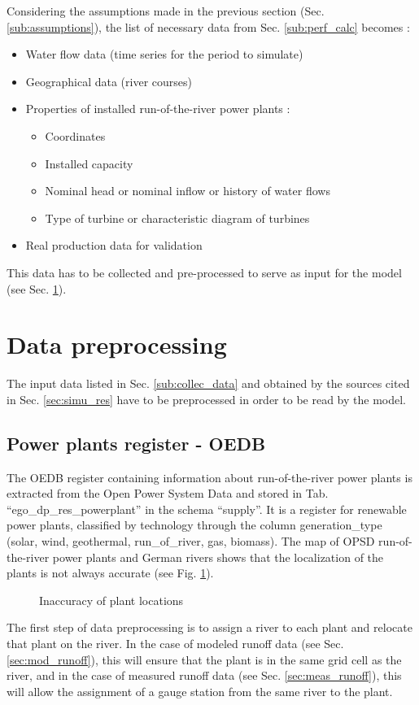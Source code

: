 Considering the assumptions made in the previous section (Sec. \ref{sub:assumptions}), the list of necessary data from Sec. \ref{sub:perf_calc} becomes :
\begin{itemize}
 \item Water flow data (time series for the period to simulate)
 \item Geographical data (river courses)
 \item Properties of installed run-of-the-river power plants :
 \begin{itemize}
  \item Coordinates
  \item Installed capacity
  \item Nominal head or nominal inflow or history of water flows
  \item Type of turbine or characteristic diagram of turbines
 \end{itemize}
 \item Real production data for validation
\end{itemize}

This data has to be collected and pre-processed to serve as input for the model (see Sec. \ref{sec:data_preproc}).

\section{Data preprocessing}
\label{sec:data_preproc}
The input data listed in Sec. \ref{sub:collec_data} and obtained by the sources cited in Sec. \ref{sec:simu_res} have to be preprocessed in order to be read by the model.

\subsection{Power plants register - OEDB}
\label{sub:pp_reg}

The OEDB register containing information about run-of-the-river power plants is extracted from the Open Power System Data and stored in Tab. ``ego{\_}dp{\_}res{\_}powerplant'' in the schema ``supply''. It is a register for renewable power plants, classified by technology through the column generation{\_}type (solar, wind, geothermal, run{\_}of{\_}river, gas, biomass). The map of OPSD run-of-the-river power plants and German rivers shows that the localization of the plants is not always accurate (see Fig. \ref{pp_river_dist}).
\begin{figure}[H]
\center
{}
\caption{Inaccuracy of plant locations}
\label{pp_river_dist}
\end{figure}
The first step of data preprocessing is to assign a river to each plant and relocate that plant on the river. \newline
In the case of modeled runoff data (see Sec. \ref{sec:mod_runoff}), this will ensure that the plant is in the same grid cell as the river, and in the case of measured runoff data (see Sec. \ref{sec:meas_runoff}), this will allow the assignment of a gauge station from the same river to the plant.


